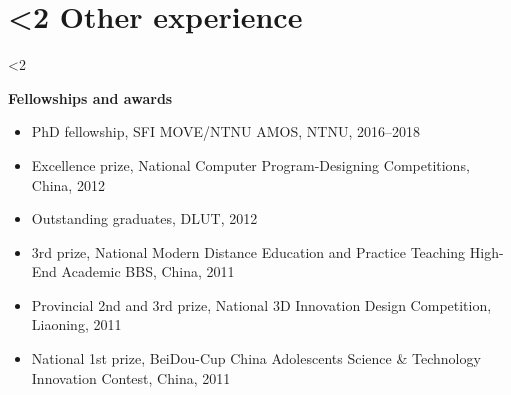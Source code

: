 \documentclass[10pt]{ctexart}
\begin{document}
\section*{\textbf{\ifnum\value{num}<2 {Other experience}  \fi}}\vspace{-1.5em}
\ifnum\value{num}<2 {
    \textbf{Fellowships and awards}\vspace{-1.00em}
    \begin{itemize}[label={}] \setlength\itemsep{0.5em}
    \item PhD fellowship, SFI MOVE/NTNU AMOS, NTNU, 2016--2018
    \item Excellence prize, National Computer Program-Designing Competitions, China, 2012
    \item Outstanding graduates, DLUT, 2012
    \item 3rd prize, National Modern Distance Education and Practice Teaching High-End Academic BBS, China, 2011
    \item Provincial 2nd and 3rd prize, National 3D Innovation Design Competition, Liaoning, 2011
    \item National 1st prize, BeiDou-Cup China Adolescents Science \& Technology Innovation Contest, China, 2011
    \end{itemize}
}\fi
\vspace*{0.1em}
\end{document}
